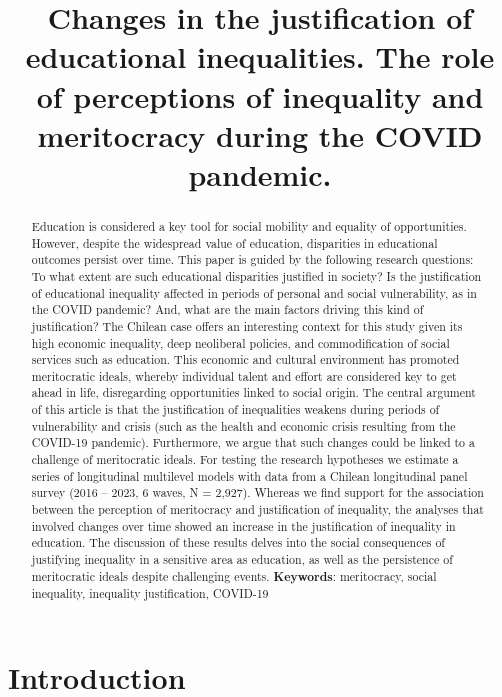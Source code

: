 \documentclass[
  10pt]{article}
\title{Changes in the justification of educational inequalities. The
role of perceptions of inequality and meritocracy during the COVID
pandemic.}
\author{}
\date{}
\begin{document}
\maketitle
\begin{abstract}
Education is considered a key tool for social mobility and equality of
opportunities. However, despite the widespread value of education,
disparities in educational outcomes persist over time. This paper is
guided by the following research questions: To what extent are such
educational disparities justified in society? Is the justification of
educational inequality affected in periods of personal and social
vulnerability, as in the COVID pandemic? And, what are the main factors
driving this kind of justification? The Chilean case offers an
interesting context for this study given its high economic inequality,
deep neoliberal policies, and commodification of social services such as
education. This economic and cultural environment has promoted
meritocratic ideals, whereby individual talent and effort are considered
key to get ahead in life, disregarding opportunities linked to social
origin. The central argument of this article is that the justification
of inequalities weakens during periods of vulnerability and crisis (such
as the health and economic crisis resulting from the COVID-19 pandemic).
Furthermore, we argue that such changes could be linked to a challenge
of meritocratic ideals. For testing the research hypotheses we estimate
a series of longitudinal multilevel models with data from a Chilean
longitudinal panel survey (2016 -- 2023, 6 waves, N = 2,927). Whereas we
find support for the association between the perception of meritocracy
and justification of inequality, the analyses that involved changes over
time showed an increase in the justification of inequality in education.
The discussion of these results delves into the social consequences of
justifying inequality in a sensitive area as education, as well as the
persistence of meritocratic ideals despite challenging events.\newline
\textbf{Keywords}: meritocracy, social inequality, inequality
justification, COVID-19
\end{abstract}


\section{Introduction}\label{introduction}
\end{document}
